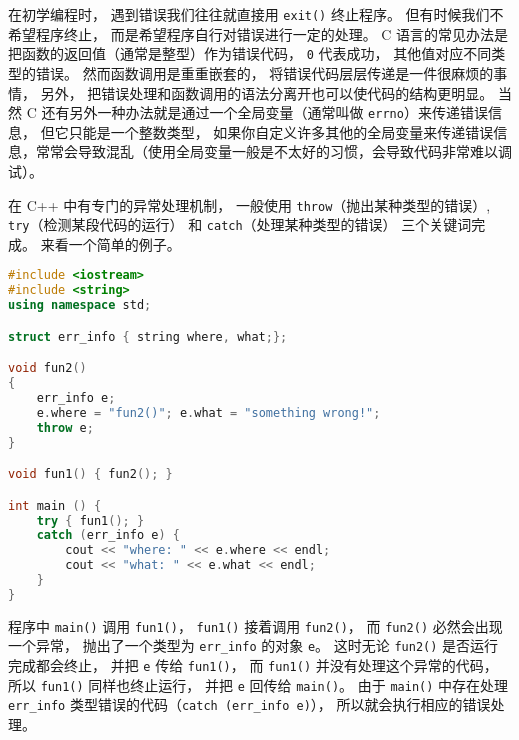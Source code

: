 
\begin{issues}
\issueDraft
\end{issues}

在初学编程时， 遇到错误我们往往就直接用 \verb`exit()` 终止程序。 但有时候我们不希望程序终止， 而是希望程序自行对错误进行一定的处理。 C 语言的常见办法是把函数的返回值（通常是整型）作为错误代码， \verb`0` 代表成功， 其他值对应不同类型的错误。 然而函数调用是重重嵌套的， 将错误代码层层传递是一件很麻烦的事情， 另外， 把错误处理和函数调用的语法分离开也可以使代码的结构更明显。 当然 C 还有另外一种办法就是通过一个全局变量（通常叫做 \verb`errno`）来传递错误信息， 但它只能是一个整数类型， 如果你自定义许多其他的全局变量来传递错误信息，常常会导致混乱（使用全局变量一般是不太好的习惯，会导致代码非常难以调试）。

在 C++ 中有专门的异常处理机制， 一般使用 \verb`throw`（抛出某种类型的错误）, \verb`try`（检测某段代码的运行） 和 \verb`catch`（处理某种类型的错误） 三个关键词完成。 来看一个简单的例子。

\begin{lstlisting}[language=cpp]
#include <iostream>
#include <string>
using namespace std;

struct err_info { string where, what;};

void fun2()
{
	err_info e;
	e.where = "fun2()"; e.what = "something wrong!";
	throw e;
}

void fun1() { fun2(); }

int main () {
	try { fun1(); }
	catch (err_info e) {
		cout << "where: " << e.where << endl;
		cout << "what: " << e.what << endl; 
	}
}
\end{lstlisting}
程序中 \verb`main()` 调用 \verb`fun1()`， \verb`fun1()` 接着调用 \verb`fun2()`， 而 \verb`fun2()` 必然会出现一个异常， 抛出了一个类型为 \verb`err_info` 的对象 \verb`e`。 这时无论 \verb`fun2()` 是否运行完成都会终止， 并把 \verb`e` 传给 \verb`fun1()`， 而 \verb`fun1()` 并没有处理这个异常的代码， 所以 \verb`fun1()` 同样也终止运行， 并把 \verb`e` 回传给 \verb`main()`。 由于 \verb`main()` 中存在处理 \verb`err_info` 类型错误的代码（\verb`catch (err_info e)`）， 所以就会执行相应的错误处理。
